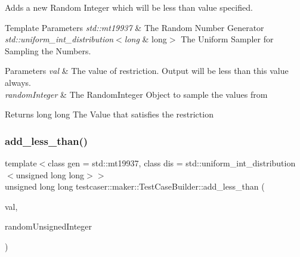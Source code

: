 Adds a new Random Integer which will be less than value specified. 


\begin{DoxyTemplParams}{Template Parameters}
{\em std\+::mt19937} & The Random Number Generator \\
\hline
{\em std\+::uniform\+\_\+int\+\_\+distribution$<$long} & long$>$ The Uniform Sampler for Sampling the Numbers. \\
\hline
\end{DoxyTemplParams}

\begin{DoxyParams}{Parameters}
{\em val} & The value of restriction. Output will be less than this value always. \\
\hline
{\em random\+Integer} & The Random\+Integer Object to sample the values from \\
\hline
\end{DoxyParams}
\begin{DoxyReturn}{Returns}
long long The Value that satisfies the restriction 
\end{DoxyReturn}
\mbox{\label{classtestcaser_1_1maker_1_1TestCaseBuilder_abc8a125ff2b991fc530a8263ba10ff3f}} 
\subsubsection{\texorpdfstring{add\+\_\+less\+\_\+than()}{add\_less\_than()}\hspace{0.1cm}{\footnotesize\ttfamily [2/2]}}
{\footnotesize\ttfamily template$<$class gen  = std\+::mt19937, class dis  = std\+::uniform\+\_\+int\+\_\+distribution$<$unsigned long long$>$$>$ \\
unsigned long long testcaser\+::maker\+::\+Test\+Case\+Builder\+::add\+\_\+less\+\_\+than (\begin{DoxyParamCaption}\item[{unsigned long long}]{val,  }\item[{\hyperlink{classtestcaser_1_1maker_1_1types_1_1RandomUnsignedInteger}{types\+::\+Random\+Unsigned\+Integer}$<$ gen, dis $>$ \&}]{random\+Unsigned\+Integer }\end{DoxyParamCaption})\hspace{0.3cm}{\ttfamily [inline]}}



